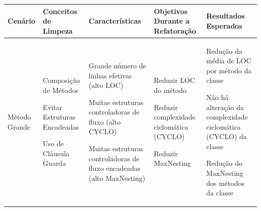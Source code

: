 \begin{landscape}

\begin{table}[hbt]

\begin{tabular}{|p{3cm}|p{4.5cm}|p{5.0cm}|p{5.5cm}|p{5.0cm}|}
\hline 
\textbf{Cenário} & \textbf{Conceitos de Limpeza} & \textbf{Características} & \textbf{Objetivos Durante a Refatoração} & \textbf{Resultados Esperados} \tabularnewline
\hline
                     

\hline 
Método Grande                           
& \begin{my_itemize}
    \item Composição de Métodos
	\item Evitar Estruturas Encadeadas
	\item Uso de Cláusula Guarda
  \end{my_itemize}
& \begin{my_itemize}
	\item Grande número de linhas efetivas (alto LOC)
	\item Muitas estruturas controladoras de fluxo (alto CYCLO)
	\item Muitas estruturas controladoras de fluxo encadeadas (alto MaxNesting)   
   \end{my_itemize}
& \begin{my_itemize}
	\item Reduzir LOC do método
	\item Reduzir complexidade ciclomática (CYCLO)
	\item Reduzir MaxNesting
  \end{my_itemize}
& \begin{my_itemize}
	\item Redução da média de LOC por método da classe
	\item Não há alteração da complexidade ciclomática (CYCLO) da classe
	\item Redução do MaxNesting dos métodos da classe
  \end{my_itemize}
\tabularnewline
      

\end{tabular}
\end{table}
\end{landscape}

